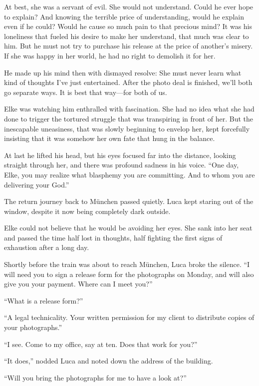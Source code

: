 At best, she was a servant of evil. She would not understand. Could he ever hope to explain? And knowing the terrible price of understanding, would he explain even if he could? Would he cause so much pain to that precious mind? It was his loneliness that fueled his desire to make her understand, that much was clear to him. But he must not try to purchase his release at the price of another's misery. If she was happy in her world, he had no right to demolish it for her.

He made up his mind then with dismayed resolve: She must never learn what kind of thoughts I've just entertained. After the photo deal is finished, we'll both go separate ways. It is best that way---for both of us.

Elke was watching him enthralled with fascination. She had no idea what she had done to trigger the tortured struggle that was transpiring in front of her. But the inescapable uneasiness, that was slowly beginning to envelop her, kept forcefully insisting that it was somehow her own fate that hung in the balance.

At last he lifted his head, but his eyes focused far into the distance, looking straight through her, and there was profound sadness in his voice. ``One day, Elke, you may realize what blasphemy you are committing. And to whom you are delivering your God.''

\sectionline

The return journey back to München passed quietly. Luca kept staring out of the window, despite it now being completely dark outside.

Elke could not believe that he would be avoiding her eyes. She sank into her seat and passed the time half lost in thoughts, half fighting the first signs of exhaustion after a long day.

Shortly before the train was about to reach München, Luca broke the silence. ``I will need you to sign a release form for the photographs on Monday, and will also give you your payment. Where can I meet you?''

``What is a release form?''

``A legal technicality. Your written permission for my client to distribute copies of your photographs.''

``I see. Come to my office, say at ten. Does that work for you?''

``It does,'' nodded Luca and noted down the address of the building.

``Will you bring the photographs for me to have a look at?''

